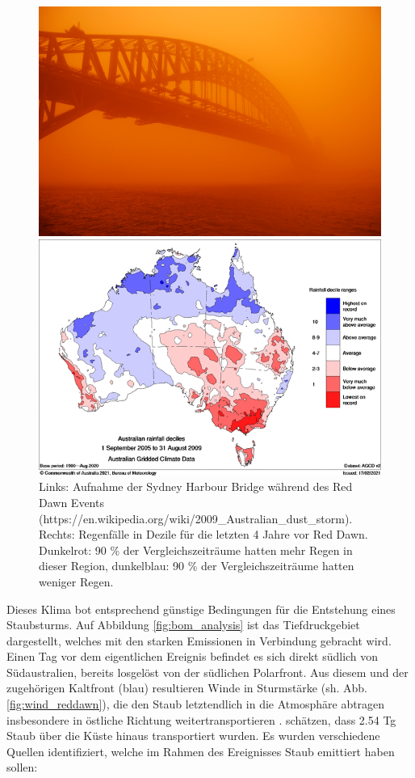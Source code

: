 \documentclass[12pt,a4paper,onecolumn]{scrartcl}
\begin{document}
\begin{figure}
	\begin{minipage}[c]{0.5\textwidth}
		\includegraphics[width=\textwidth]{bilder/reddawn/SHB.jpg}
	\end{minipage}\hfill
	\begin{minipage}[c]{0.49\textwidth}
		\includegraphics[width=\textwidth]{bilder/reddawn/drought.png}
	\end{minipage}\hfill
	\caption{Links: Aufnahme der Sydney Harbour Bridge während des Red Dawn Events (https://en.wikipedia.org/wiki/2009_Australian_dust_storm). Rechts: Regenfälle in Dezile für die letzten 4 Jahre vor Red Dawn. Dunkelrot: 90 \% der Vergleichszeiträume hatten mehr Regen in dieser Region, dunkelblau: 90 \% der Vergleichszeiträume hatten weniger Regen.} \label{fig:reddawn}
\end{figure}
Dieses Klima bot entsprechend günstige Bedingungen für die Entstehung eines Staubsturms. Auf Abbildung \ref{fig:bom_analysis} ist das Tiefdruckgebiet dargestellt, welches mit den starken Emissionen in Verbindung gebracht wird. Einen Tag vor dem eigentlichen Ereignis befindet es sich direkt südlich von Südaustralien, bereits losgelöst von der südlichen Polarfront. Aus diesem und der zugehörigen Kaltfront (blau) resultieren Winde in Sturmstärke (sh. Abb. \ref{fig:wind_reddawn}), die den Staub letztendlich in die Atmosphäre abtragen insbesondere in östliche Richtung weitertransportieren \citep{Leys.2011}.\citet{Leys.2011} schätzen, dass 2.54 Tg Staub über die Küste hinaus transportiert wurden.  Es wurden verschiedene Quellen identifiziert, welche im Rahmen des Ereignisses Staub emittiert haben sollen:
\end{document}
